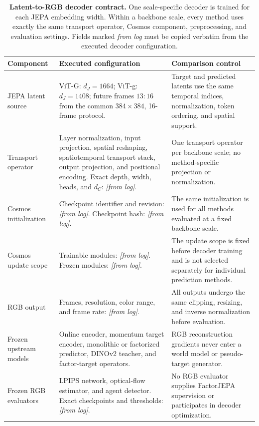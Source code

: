 \begin{table}[t]
\centering
\caption{
\textbf{Latent-to-RGB decoder contract.}
One scale-specific decoder is trained for each JEPA embedding width.
Within a backbone scale, every method uses exactly the same transport
operator, Cosmos component, preprocessing, and evaluation settings.
Fields marked \emph{from log} must be copied verbatim from the executed
decoder configuration.
}
\label{tab:rgb_decoder_contract}
\scriptsize
\setlength{\tabcolsep}{5pt}
\renewcommand{\arraystretch}{1.15}

\begin{tabularx}{\textwidth}{
    p{}
    >{\raggedright\arraybackslash}X
    >{\raggedright\arraybackslash}X
}
\toprule
\textbf{Component}
&
\textbf{Executed configuration}
&
\textbf{Comparison control}
\\
\midrule

\rowcolor{DecoderBlue}
JEPA latent source
&
ViT-G: \(d_J=1664\);
ViT-g: \(d_J=1408\);
future frames \(13{:}16\) from the common \(384\times384\),
16-frame protocol.
&
Target and predicted latents use the same temporal indices,
normalization, token ordering, and spatial support.
\\

Transport operator
&
Layer normalization, input projection, spatial reshaping,
spatiotemporal transport stack, output projection, and positional
encoding. Exact depth, width, heads, and \(d_C\):
\emph{[from log]}.
&
One transport operator per backbone scale; no method-specific
projection or normalization.
\\

Cosmos initialization
&
Checkpoint identifier and revision:
\emph{[from log]}. Checkpoint hash:
\emph{[from log]}.
&
The same initialization is used for all methods evaluated at a fixed
backbone scale.
\\

Cosmos update scope
&
Trainable modules:
\emph{[from log]}. Frozen modules:
\emph{[from log]}.
&
The update scope is fixed before decoder training and is not selected
separately for individual prediction methods.
\\

RGB output
&
Frames, resolution, color range, and frame rate:
\emph{[from log]}.
&
All outputs undergo the same clipping, resizing, and inverse
normalization before evaluation.
\\

Frozen upstream models
&
Online encoder, momentum target encoder, monolithic or factorized
predictor, DINOv2 teacher, and factor-target operators.
&
RGB reconstruction gradients never enter a world model or
pseudo-target generator.
\\

Frozen RGB evaluators
&
LPIPS network, optical-flow estimator, and agent detector.
Exact checkpoints and thresholds: \emph{[from log]}.
&
No RGB evaluator supplies FactorJEPA supervision or participates in
decoder optimization.
\\

\bottomrule
\end{tabularx}
\end{table}


